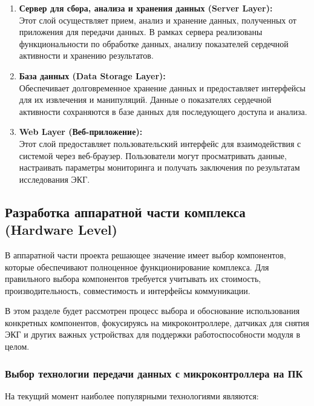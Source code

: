 \documentclass[12pt, russian]{extarticle}
\begin{document}
\begin{spacing}{1.5}
\begin {enumerate}
    \item \textbf{Сервер для сбора, анализа и хранения данных (Server Layer):} \\
        Этот слой осуществляет прием, анализ и хранение данных, полученных от приложения для передачи данных.
        В рамках сервера реализованы функциональности по обработке данных, анализу показателей сердечной активности и хранению результатов.

    \item \textbf{База данных (Data Storage Layer):} \\
        Обеспечивает долговременное хранение данных и предоставляет интерфейсы для их извлечения и манипуляций.
        Данные о показателях сердечной активности сохраняются в базе данных для последующего доступа и анализа.

    \item \textbf{Web Layer (Веб-приложение):} \\
        Этот слой предоставляет пользовательский интерфейс для взаимодействия с системой через веб-браузер. Пользователи могут просматривать данные, настраивать параметры мониторинга и получать заключения по результатам исследования ЭКГ.
\end{enumerate}

\newpage
\subsection{Разработка аппаратной части комплекса (Hardware Level)}

В аппаратной части проекта решающее значение имеет выбор компонентов, которые обеспечивают полноценное функционирование комплекса. Для правильного выбора компонентов требуется учитывать их стоимость, производительность, совместимость и интерфейсы коммуникации.

В этом разделе будет рассмотрен процесс выбора и обоснование использования конкретных компонентов, фокусируясь на микроконтроллере, датчиках для снятия ЭКГ и других важных устройствах для поддержки работоспособности модуля в целом.

\subsubsection{Выбор технологии передачи данных с микроконтроллера на ПК}

\noindent На текущий момент наиболее популярными технологиями являются:


\end{spacing}
\end{document}
